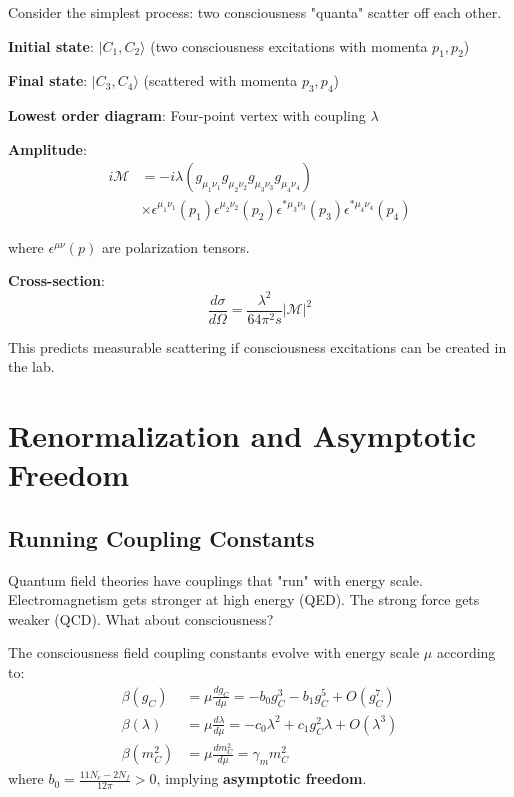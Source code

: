 \begin{level2}
Consider the simplest process: two consciousness "quanta" scatter off each other.

\textbf{Initial state}: $|C_1, C_2\rangle$ (two consciousness excitations with momenta $p_1, p_2$)

\textbf{Final state}: $|C_3, C_4\rangle$ (scattered with momenta $p_3, p_4$)

\textbf{Lowest order diagram}: Four-point vertex with coupling $\lambda$

\textbf{Amplitude}:
\begin{align}
i\mathcal{M} &= -i\lambda (g_{\mu_1\nu_1}g_{\mu_2\nu_2}g_{\mu_3\nu_3}g_{\mu_4\nu_4}) \\
&\times \epsilon^{\mu_1\nu_1}(p_1) \epsilon^{\mu_2\nu_2}(p_2) \epsilon^{*\mu_3\nu_3}(p_3) \epsilon^{*\mu_4\nu_4}(p_4)
\end{align}

where $\epsilon^{\mu\nu}(p)$ are polarization tensors.

\textbf{Cross-section}:
\begin{equation}
\frac{d\sigma}{d\Omega} = \frac{\lambda^2}{64\pi^2 s} |\mathcal{M}|^2
\end{equation}

This predicts measurable scattering if consciousness excitations can be created in the lab.
\end{level2}

\section{Renormalization and Asymptotic Freedom}

\subsection{Running Coupling Constants}

Quantum field theories have couplings that "run" with energy scale\cite{peskin1995,weinberg1995}. Electromagnetism gets stronger at high energy (QED). The strong force gets weaker (QCD)\cite{gross1973,politzer1973reliable}. What about consciousness?

\begin{thm}\label{thm:consciousness-rg}
The consciousness field coupling constants evolve with energy scale $\mu$ according to:
\begin{align}
\beta(g_C) &= \mu \frac{dg_C}{d\mu} = -b_0 g_C^3 - b_1 g_C^5 + O(g_C^7)\\
\beta(\lambda) &= \mu \frac{d\lambda}{d\mu} = -c_0 \lambda^2 + c_1 g_C^2 \lambda + O(\lambda^3)\\
\beta(m_C^2) &= \mu \frac{dm_C^2}{d\mu} = \gamma_m m_C^2
\end{align}
where $b_0 = \frac{11N_c - 2N_f}{12\pi} > 0$, implying \textbf{asymptotic freedom}.
\end{thm}

